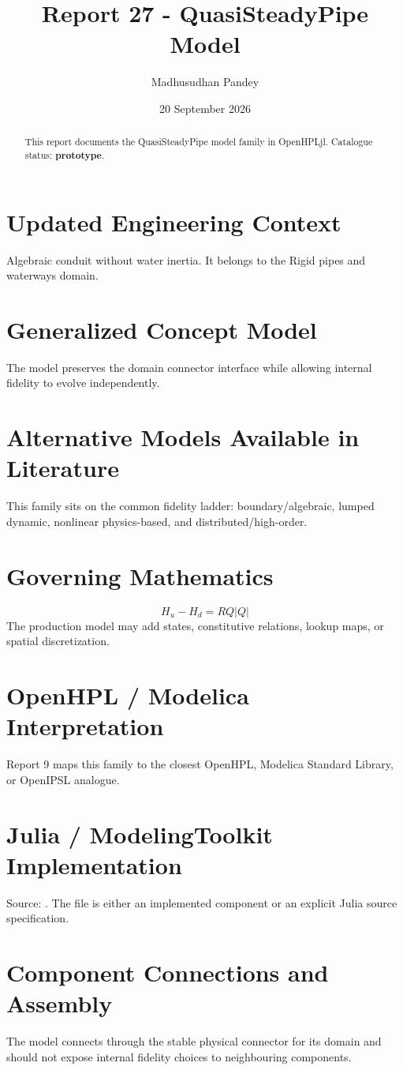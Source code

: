 \documentclass[10pt,a4paper]{article}
\title{Report 27 - QuasiSteadyPipe Model}
\author{Madhusudhan Pandey}
\date{20 September 2026}
\begin{document}
\maketitle
\begin{abstract}This report documents the QuasiSteadyPipe model family in OpenHPLjl. Catalogue status: \textbf{prototype}.\end{abstract}
\section{Updated Engineering Context}Algebraic conduit without water inertia. It belongs to the Rigid pipes and waterways domain.
\section{Generalized Concept Model}The model preserves the domain connector interface while allowing internal fidelity to evolve independently.
\section{Alternative Models Available in Literature}This family sits on the common fidelity ladder: boundary/algebraic, lumped dynamic, nonlinear physics-based, and distributed/high-order.
\section{Governing Mathematics}\[H_u-H_d=R Q|Q|\]The production model may add states, constitutive relations, lookup maps, or spatial discretization.
\section{OpenHPL / Modelica Interpretation}Report 9 maps this family to the closest OpenHPL, Modelica Standard Library, or OpenIPSL analogue.
\section{Julia / ModelingToolkit Implementation}Source: \texttt{}. The file is either an implemented component or an explicit Julia source specification.
\section{Component Connections and Assembly}The model connects through the stable physical connector for its domain and should not expose internal fidelity choices to neighbouring components.
\end{document}
